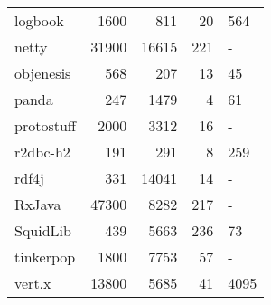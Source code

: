 \documentclass[preview]{standalone}
\begin{document}
\begin{tabular}{lrrrl}
 logbook             &           1600 &              811 &                  20 & 564                 \\
 netty               &          31900 &            16615 &                 221 & -                   \\
 objenesis           &            568 &              207 &                  13 & 45                  \\
 panda               &            247 &             1479 &                   4 & 61                  \\
 protostuff          &           2000 &             3312 &                  16 & -                   \\
 r2dbc-h2            &            191 &              291 &                   8 & 259                 \\
 rdf4j               &            331 &            14041 &                  14 & -                   \\
 RxJava              &          47300 &             8282 &                 217 & -                   \\
 SquidLib            &            439 &             5663 &                 236 & 73                  \\
 tinkerpop           &           1800 &             7753 &                  57 & -                   \\
 vert.x              &          13800 &             5685 &                  41 & 4095                \\
\bottomrule
\end{tabular}
    
\end{document}
